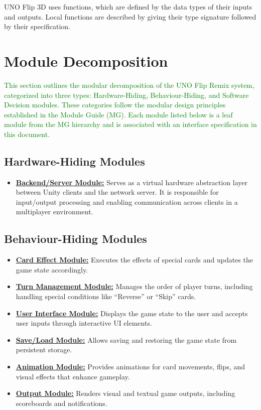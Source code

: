 \documentclass[12pt, titlepage]{article}
\newcommand{\added}[1]{\textcolor{green}{#1}}
\begin{document}
\vspace{0.5em}
\noindent
UNO Flip 3D uses functions, which are defined by the data types of their inputs and outputs. Local functions are described by giving their type signature followed by their specification.

\section{Module Decomposition}

\added{This section outlines the modular decomposition of the UNO Flip Remix system, categorized into three types: Hardware-Hiding, Behaviour-Hiding, and Software Decision modules. These categories follow the modular design principles established in the Module Guide (MG). Each module listed below is a leaf module from the MG hierarchy and is associated with an interface specification in this document.}

\subsection{Hardware-Hiding Modules}

\begin{itemize}
\item \hyperref[BSM]{\textbf{Backend/Server Module:}} Serves as a virtual hardware abstraction layer between Unity clients and the network server. It is responsible for input/output processing and enabling communication across clients in a multiplayer environment.
\end{itemize}

\subsection{Behaviour-Hiding Modules}

\begin{itemize}
\item \hyperref[CEM]{\textbf{Card Effect Module:}} Executes the effects of special cards and updates the game state accordingly.
\item \hyperref[TMM]{\textbf{Turn Management Module:}} Manages the order of player turns, including handling special conditions like “Reverse” or “Skip” cards.
\item \hyperref[UIM]{\textbf{User Interface Module:}} Displays the game state to the user and accepts user inputs through interactive UI elements.
\item \hyperref[SLM]{\textbf{Save/Load Module:}} Allows saving and restoring the game state from persistent storage.
\item \hyperref[AM]{\textbf{Animation Module:}} Provides animations for card movements, flips, and visual effects that enhance gameplay.
\item \hyperref[OM]{\textbf{Output Module:}} Renders visual and textual game outputs, including scoreboards and notifications.
\end{itemize}
\end{document}

